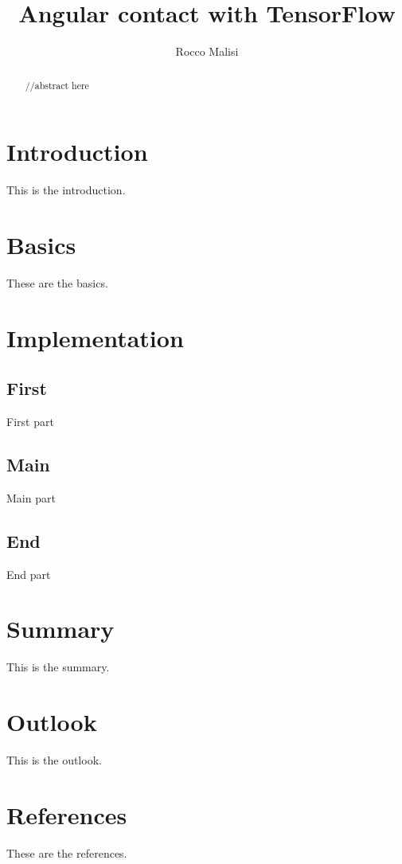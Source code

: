 \documentclass{article}
\title{Angular contact with TensorFlow}
\author{Rocco Malisi}
\begin{document}
\date{}
\maketitle

\newpage

\begin{abstract}
//abstract here
\end{abstract}

\newpage

\tableofcontents

\newpage

\section{Introduction}
This is the introduction.

\newpage

\section{Basics}
These are the basics.

\newpage

\section{Implementation}
\subsection{First}
First part 
\subsection{Main}
Main part
\subsection{End}
End part

\newpage

\section{Summary}
This is the summary.

\newpage

\section{Outlook}
This is the outlook.

\newpage

\section{References}
These are the references.
\end{document}
